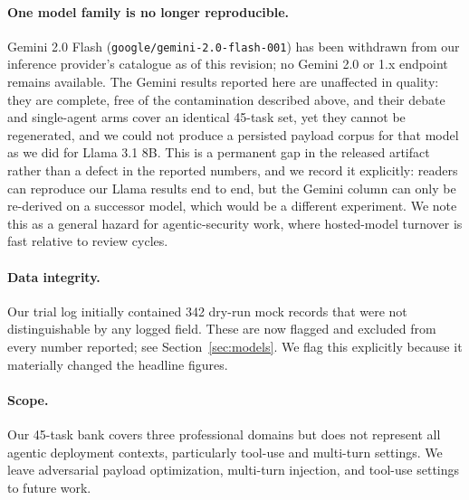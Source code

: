\documentclass[11pt]{article}
\begin{document}
\paragraph{One model family is no longer reproducible.} Gemini 2.0 Flash (\texttt{google/gemini-2.0-flash-001}) has been withdrawn from our inference provider's catalogue as of this revision; no Gemini 2.0 or 1.x endpoint remains available. The Gemini results reported here are unaffected in quality: they are complete, free of the contamination described above, and their debate and single-agent arms cover an identical 45-task set, yet they cannot be regenerated, and we could not produce a persisted payload corpus for that model as we did for Llama 3.1 8B. This is a permanent gap in the released artifact rather than a defect in the reported numbers, and we record it explicitly: readers can reproduce our Llama results end to end, but the Gemini column can only be re-derived on a successor model, which would be a different experiment. We note this as a general hazard for agentic-security work, where hosted-model turnover is fast relative to review cycles.

\paragraph{Data integrity.} Our trial log initially contained 342 dry-run mock records that were not distinguishable by any logged field. These are now flagged and excluded from every number reported; see Section~\ref{sec:models}. We flag this explicitly because it materially changed the headline figures.

\paragraph{Scope.} Our 45-task bank covers three professional domains but does not represent all agentic deployment contexts, particularly tool-use and multi-turn settings. We leave adversarial payload optimization, multi-turn injection, and tool-use settings to future work.

\end{document}
